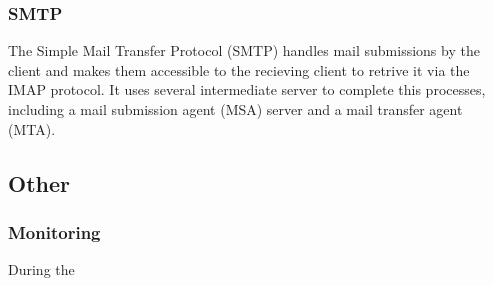 \subsubsection{SMTP}
The Simple Mail Transfer Protocol (SMTP) handles mail submissions by the
client and makes them accessible to the recieving client to retrive it
via the IMAP protocol. It uses several intermediate server to complete
this processes, including a mail submission agent (MSA) server and a
mail transfer agent (MTA).
\subsection{Other}
\subsubsection{Monitoring}
During the 

